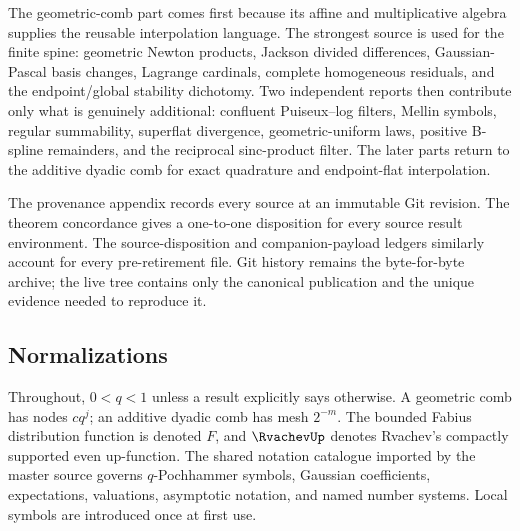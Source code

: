 The geometric-comb part comes first because its affine and multiplicative
algebra supplies the reusable interpolation language.  The strongest source
is used for the finite spine: geometric Newton products, Jackson divided
differences, Gaussian-Pascal basis changes, Lagrange cardinals, complete
homogeneous residuals, and the endpoint/global stability dichotomy.  Two
independent reports then contribute only what is genuinely additional:
confluent Puiseux--log filters, Mellin symbols, regular summability, superflat
divergence, geometric-uniform laws, positive B-spline remainders, and the
reciprocal sinc-product filter.  The later parts return to the additive dyadic
comb for exact quadrature and endpoint-flat interpolation.

The provenance appendix records every source at an immutable Git revision.
The theorem concordance gives a one-to-one disposition for every source result
environment.  The source-disposition and companion-payload ledgers similarly
account for every pre-retirement file.  Git history remains the byte-for-byte
archive; the live tree contains only the canonical publication and the unique
evidence needed to reproduce it.

\subsection*{Normalizations}

Throughout, $0<q<1$ unless a result explicitly says otherwise.  A geometric
comb has nodes $cq^j$; an additive dyadic comb has mesh $2^{-m}$.  The bounded
Fabius distribution function is denoted $F$, and $\RvachevUp$ denotes
Rvachev's compactly supported even up-function.  The shared notation catalogue
imported by the master source governs $q$-Pochhammer symbols, Gaussian
coefficients, expectations, valuations, asymptotic notation, and named number
systems.  Local symbols are introduced once at first use.
